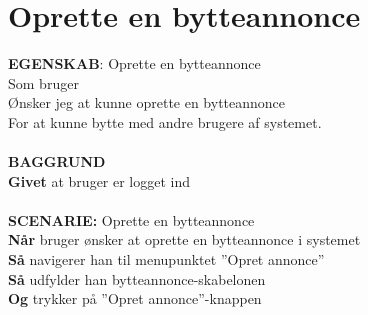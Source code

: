 \section{Oprette en bytteannonce}
{\color{blue}\textbf{EGENSKAB}:} Oprette en bytteannonce \\
Som bruger \\
Ønsker jeg at kunne oprette en bytteannonce \\
For at kunne bytte med andre brugere af systemet.\\ \\
{\color{blue}\textbf{BAGGRUND}} \\
{\color{blue}\textbf{Givet}} at bruger er logget ind \\ \\
{\color{blue}\textbf{SCENARIE:}} Oprette en bytteannonce \\
{\color{blue}\textbf{Når}}  bruger ønsker at oprette en bytteannonce i systemet \\
{\color{blue}\textbf{Så}} navigerer han til menupunktet ”Opret annonce” \\
{\color{blue}\textbf{Så}} udfylder han bytteannonce-skabelonen \\
{\color{blue}\textbf{Og}} trykker på ”Opret annonce”-knappen